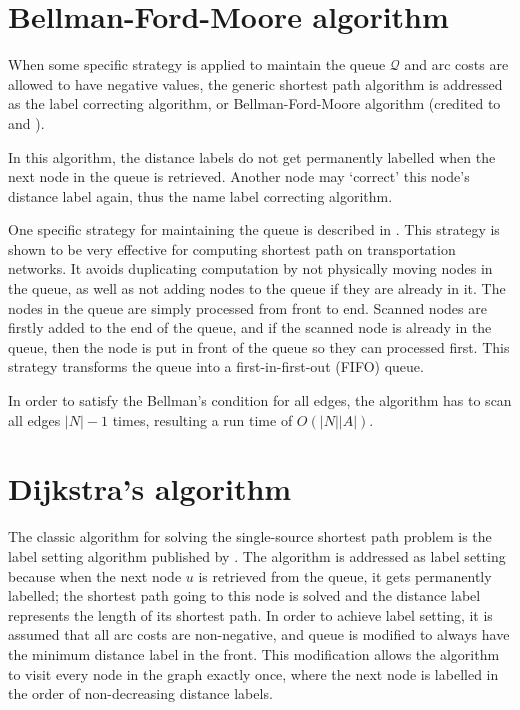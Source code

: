 \section{Bellman-Ford-Moore algorithm} \label{section:labelcorrectingalgorithm}
When some specific strategy is applied to maintain the queue $\mathcal{Q}$
and arc costs are allowed to have negative values,
the generic shortest path algorithm is addressed as the label correcting algorithm,
or Bellman-Ford-Moore algorithm (credited to \citet{Bellman, Ford} and \citet{Moore}).

In this algorithm,
the distance labels do not get permanently labelled when the next node in the queue is retrieved.
Another node may `correct' this node's distance label again,
thus the name label correcting algorithm.

One specific strategy for maintaining the queue is described in \citet{Sheffi}.
This strategy is shown to be very effective for computing shortest path on transportation networks.
It avoids duplicating computation by not physically moving nodes in the queue,
as well as not adding nodes to the queue if they are already in it.
The nodes in the queue are simply processed from front to end.
Scanned nodes are firstly added to the end of the queue,
and if the scanned node is already in the queue,
then the node is put in front of the queue so they can processed first.
This strategy transforms the queue into a first-in-first-out (FIFO) queue.

In order to satisfy the Bellman's condition for all edges,
the algorithm has to scan all edges $|N|-1$ times,
resulting a run time of $O(|N||A|)$.

\section{Dijkstra's algorithm} \label{sec:dijkstra}
The classic algorithm for solving the single-source shortest path problem is the label setting algorithm published by \citet{Dijkstra}.
The algorithm is addressed as label setting because when the next node $u$ is retrieved from the queue,
it gets permanently labelled;
the shortest path going to this node is solved and 
the distance label represents the length of its shortest path.
In order to achieve label setting, 
it is assumed that all arc costs are non-negative,
and queue is modified to always have the minimum distance label in the front.
This modification allows the algorithm to visit every node in the graph exactly once,
where the next node is labelled in the order of non-decreasing distance labels.

